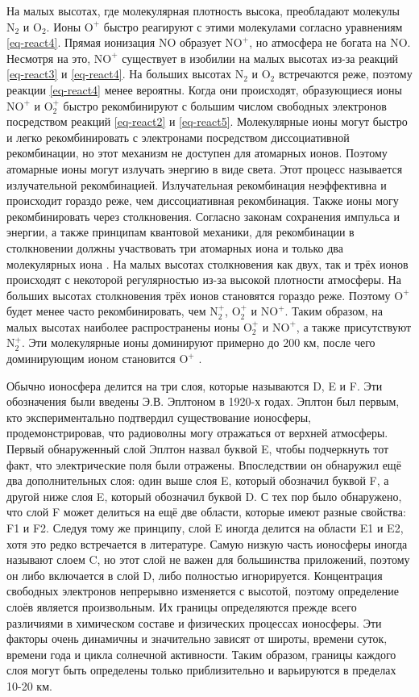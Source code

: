 На малых высотах, где молекулярная плотность высока, преобладают молекулы $\text{N}_2$ и $\text{O}_2$.
Ионы $\text{O}^{+}$ быстро реагируют с этими молекулами согласно уравнениям \eqref{eq-react4}.
Прямая ионизация NO образует $\text{NO}^{+}$, но атмосфера не богата на NO.
Несмотря на это, $\text{NO}^{+}$ существует в изобилии на малых высотах из-за реакций \eqref{eq-react3} и \eqref{eq-react4}. 
На больших высотах $\text{N}_2$ и $\text{O}_2$ встречаются реже, поэтому реакции \eqref{eq-react4} менее вероятны.
Когда они происходят, образующиеся ионы $\text{NO}^{+}$ и $\text{O}_2^{+}$ быстро рекомбинируют с большим числом свободных электронов посредством реакций \eqref{eq-react2} и \eqref{eq-react5}.
Молекулярные ионы могут быстро и легко рекомбинировать с электронами посредством диссоциативной рекомбинации, но этот механизм не доступен для атомарных ионов.
Поэтому атомарные ионы могут излучать энергию в виде света.
Этот процесс называется излучательной рекомбинацией.
Излучательная рекомбинация неэффективна и происходит гораздо реже, чем диссоциативная рекомбинация.
Также ионы могу рекомбинировать через столкновения.
Согласно законам сохранения импульса и энергии, а также принципам квантовой механики, для рекомбинации в столкновении должны участвовать три атомарных иона и только два молекулярных иона \cite{Rishbeth2003}.
На малых высотах столкновения как двух, так и трёх ионов происходят с некоторой регулярностью из-за высокой плотности атмосферы.
На больших высотах столкновения трёх ионов становятся гораздо реже.
Поэтому $\text{O}^{+}$ будет менее часто рекомбинировать, чем $\text{N}_2^{+}$, $\text{O}_2^{+}$ и $\text{NO}^{+}$.   
Таким образом, на малых высотах наиболее распространены ионы $\text{O}_2^{+}$ и $\text{NO}^{+}$, а также присутствуют $\text{N}_2^{+}$.
Эти молекулярные ионы доминируют примерно до 200 км, после чего доминирующим ионом становится $\text{O}^{+}$ \cite{Rishbeth2003}.

Обычно ионосфера делится на три слоя, которые называются D, E и F.
Эти обозначения были введены Э.В. Эплтоном в 1920-х годах.
Эплтон был первым, кто экспериментально подтвердил существование ионосферы, продемонстрировав, что радиоволны могу отражаться от верхней атмосферы.
Первый обнаруженный слой Эплтон назвал буквой E, чтобы подчеркнуть тот факт, что электрические поля были отражены.
Впоследствии он обнаружил ещё два дополнительных слоя: один выше слоя E, который обозначил буквой F, а другой ниже слоя E, который обозначил буквой D. 
С тех пор было обнаружено, что слой F может делиться на ещё две области, которые имеют разные свойства: F1 и F2.
Следуя тому же принципу, слой E иногда делится на области E1 и E2, хотя это редко встречается в литературе.
Самую низкую часть ионосферы иногда называют слоем C, но этот слой не важен для большинства приложений, поэтому он либо включается в слой D, либо полностью игнорируется.
Концентрация свободных электронов непрерывно изменяется с высотой, поэтому определение слоёв является произвольным.
Их границы определяются прежде всего различиями в химическом составе и физических процессах ионосферы.
Эти факторы очень динамичны и значительно зависят от широты, времени суток, времени года и цикла солнечной активности.
Таким образом, границы каждого слоя могут быть определены только приблизительно и варьируются в пределах 10-20 км.

